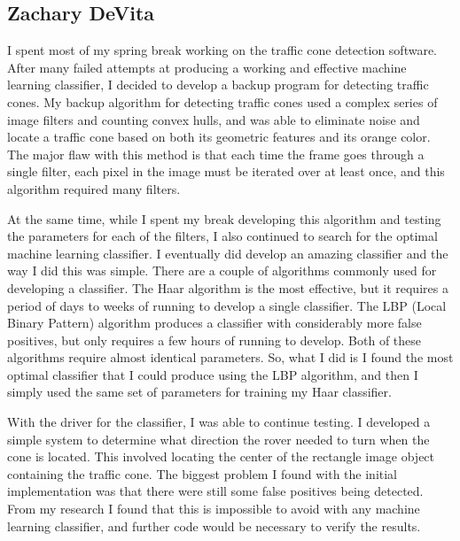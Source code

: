 \documentclass[10pt,letterpaper,onecolumn,draftclsnofoot,journal]{IEEEtran}
\begin{document}
\subsection{\textbf{Zachary DeVita}}
I spent most of my spring break working on the traffic cone detection software. After many failed attempts at producing a working and effective machine learning classifier, I decided to develop a backup program for detecting traffic cones. My backup algorithm for detecting traffic cones used a complex series of image filters and counting convex hulls, and was able to eliminate noise and locate a traffic cone based on both its geometric features and its orange color. The major flaw with this method is that each time the frame goes through a single filter, each pixel in the image must be iterated over at least once, and this algorithm required many filters.\vspace{.3cm}
\par 
At the same time, while I spent my break developing this algorithm and testing the parameters for each of the filters, I also continued to search for the optimal machine learning classifier. I eventually did develop an amazing classifier and the way I did this was simple. There are a couple of algorithms commonly used for developing a classifier. The Haar algorithm is the most effective, but it requires a period of days to weeks of running to develop a single classifier. The LBP (Local Binary Pattern) algorithm produces a classifier with considerably more false positives, but only requires a few hours of running to develop. Both of these algorithms require almost identical parameters. So, what I did is I found the most optimal classifier that I could produce using the LBP algorithm, and then I simply used the same set of parameters for training my Haar classifier.\vspace{.3cm}
\par
With the driver for the classifier, I was able to continue testing. I developed a simple system to determine what direction the rover needed to turn when the cone is located. This involved locating the center of the rectangle image object containing the traffic cone. The biggest problem I found with the initial implementation was that there were still some false positives being detected. From my research I found that this is impossible to avoid with any machine learning classifier, and further code would be necessary to verify the results.\vspace{.3cm}
\par
\end{document}
